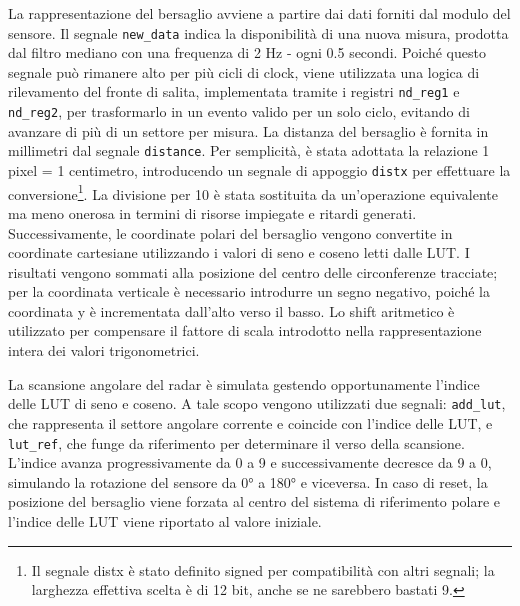 \documentclass[reprint,amsmath,amssymb,aps,rmp,twoside]{revtex4-2}
\begin{document}
\vspace{0.5cm}

La rappresentazione del bersaglio avviene a partire dai dati forniti dal modulo del sensore. Il segnale \texttt{new\_data} indica la disponibilità di una nuova misura, prodotta dal filtro mediano con una frequenza di 2 Hz - ogni 0.5 secondi. Poiché questo segnale può rimanere alto per più cicli di clock, viene utilizzata una logica di rilevamento del fronte di salita, implementata tramite i registri \texttt{nd\_reg1} e \texttt{nd\_reg2}, per trasformarlo in un evento valido per un solo ciclo, evitando di avanzare di più di un settore per misura. La distanza del bersaglio è fornita in millimetri dal segnale \texttt{distance}. Per semplicità, è stata adottata la relazione 1 pixel = 1 centimetro, introducendo un segnale di appoggio \texttt{distx} per effettuare la conversione\footnote{Il segnale distx è stato definito signed per compatibilità con altri segnali; la larghezza effettiva scelta è di 12 bit, anche se ne sarebbero bastati 9.}. La divisione per 10 è stata sostituita da un’operazione equivalente ma meno onerosa in termini di risorse impiegate e ritardi generati. Successivamente, le coordinate polari del bersaglio vengono convertite in coordinate cartesiane utilizzando i valori di seno e coseno letti dalle LUT. I risultati vengono sommati alla posizione del centro delle circonferenze tracciate; per la coordinata verticale è necessario introdurre un segno negativo, poiché la coordinata y è incrementata dall'alto verso il basso. Lo shift aritmetico è utilizzato per compensare il fattore di scala introdotto nella rappresentazione intera dei valori trigonometrici.

La scansione angolare del radar è simulata gestendo opportunamente l’indice delle LUT di seno e coseno. A tale scopo vengono utilizzati due segnali: \texttt{add\_lut}, che rappresenta il settore angolare corrente e coincide con l’indice delle LUT, e \texttt{lut\_ref}, che funge da riferimento per determinare il verso della scansione. L’indice avanza progressivamente da 0 a 9 e successivamente decresce da 9 a 0, simulando la rotazione del sensore da 0° a 180° e viceversa. In caso di reset, la posizione del bersaglio viene forzata al centro del sistema di riferimento polare e l’indice delle LUT viene riportato al valore iniziale.
\end{document}
